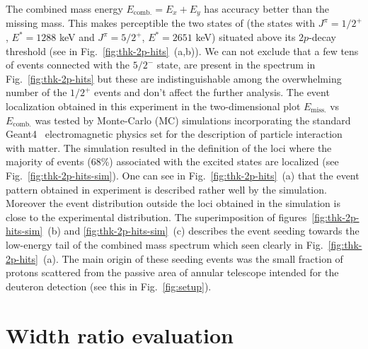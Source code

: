 \documentclass[superscriptaddress,showpacs,showkeys,twoside,floatfix,twocolumn]
{revtex4-1}
\begin{document}
The combined mass energy $E_\mathrm{comb.} = E_x + E_y$
has accuracy better than the missing mass.
This makes perceptible the two states of 
(the states with $J^\pi=1/2^+$, $E^*=1288$ keV and $J^\pi=5/2^+$, $E^*=2651$ keV)
situated above its $2p$-decay threshold (see in Fig.~\ref{fig:thk-2p-hits}~(a,b)).
We can not exclude that a few tens of events connected with the  $5/2^-$ state,
are present in the spectrum in Fig.~\ref{fig:thk-2p-hits}
but these are indistinguishable among the overwhelming number of the \(1/2^+\) events and
don't affect the further analysis.
The event localization obtained in this experiment in the two-dimensional plot
$E_\mathrm{miss.}$ vs $E_\mathrm{comb.}$ was tested by Monte-Carlo (MC) simulations
incorporating the standard Geant4~\cite{Agostinelli:2003,Allison:2006}
electromagnetic physics set for the description of particle interaction with matter.
The simulation resulted in the definition of the loci
where the majority of events (68\%) associated with the 
excited states are localized (see Fig.~\ref{fig:thk-2p-hits-sim}).
One can see in Fig.~\ref{fig:thk-2p-hits}~(a) that the event pattern
obtained in experiment is described rather well by the simulation.
Moreover the event distribution outside the loci obtained in the simulation
is close to the experimental distribution.
The superimposition of figures~\ref{fig:thk-2p-hits-sim}~(b) and
\ref{fig:thk-2p-hits-sim}~(c) describes the event seeding towards
the low-energy tail of the combined mass spectrum which seen clearly
in Fig.~\ref{fig:thk-2p-hits}~(a).
The main origin of these seeding events was
the small fraction of protons scattered from the passive area of
annular telescope intended for
the deuteron detection (see this in Fig.~\ref{fig:setup}).


\section{Width ratio evaluation}

\end{document}
